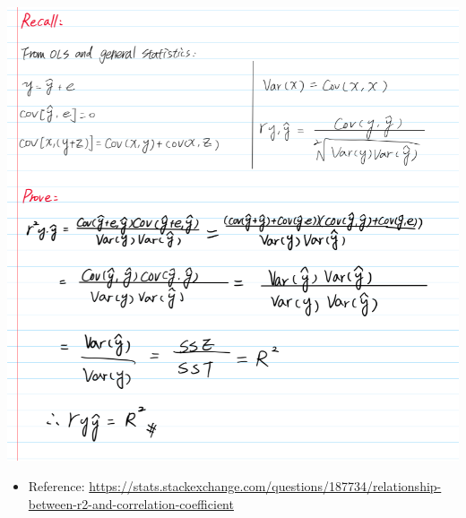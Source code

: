 \documentclass[
]{article}
\providecommand{\tightlist}{%
  \setlength{\itemsep}{0pt}\setlength{\parskip}{0pt}}
\begin{document}
\includegraphics{q6/6.png}

\begin{itemize}
\tightlist
\item
  Reference:
  \url{https://stats.stackexchange.com/questions/187734/relationship-between-r2-and-correlation-coefficient}
\end{itemize}
\end{document}
